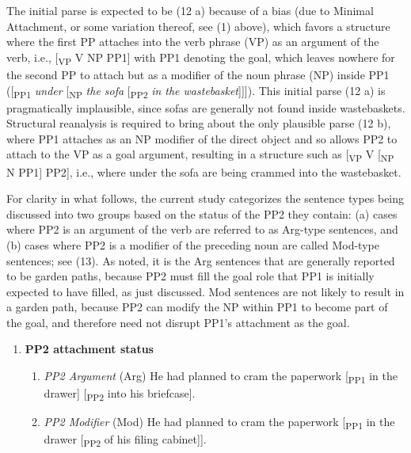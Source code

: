 \documentclass[12pt,oneside]{book}
\providecommand{\tightlist}{%
  \setlength{\itemsep}{0pt}\setlength{\parskip}{0pt}}
\begin{document}
The initial parse is expected to be (12 a) because of a bias (due to Minimal Attachment, or some variation thereof, see (1) above), which favors a structure where the first PP attaches into the verb phrase (VP) as an argument of the verb, i.e., {[}\textsubscript{VP} V NP PP1{]} with PP1 denoting the goal, which leaves nowhere for the second PP to attach but as a modifier of the noun phrase (NP) inside PP1 ({[}\textsubscript{PP1} \emph{under} {[}\textsubscript{NP} \emph{the sofa} {[}\textsubscript{PP2} \emph{in the wastebasket}{]}{]}{]}). This initial parse (12 a) is pragmatically implausible, since sofas are generally not found inside wastebaskets. Structural reanalysis is required to bring about the only plausible parse (12 b), where PP1 attaches as an NP modifier of the direct object and so allows PP2 to attach to the VP as a goal argument, resulting in a structure such as {[}\textsubscript{VP} V {[}\textsubscript{NP} N PP1{]} PP2{]}, i.e., where under the sofa are being crammed into the wastebasket.

For clarity in what follows, the current study categorizes the sentence types being discussed into two groups based on the status of the PP2 they contain: (a) cases where PP2 is an argument of the verb are referred to as Arg-type sentences, and (b) cases where PP2 is a modifier of the preceding noun are called Mod-type sentences; see (13). As noted, it is the Arg sentences that are generally reported to be garden paths, because PP2 must fill the goal role that PP1 is initially expected to have filled, as just discussed. Mod sentences are not likely to result in a garden path, because PP2 can modify the NP within PP1 to become part of the goal, and therefore need not disrupt PP1's attachment as the goal.

\begin{enumerate}
\def\labelenumi{(\arabic{enumi})}
\setcounter{enumi}{12}
\tightlist
\item
  \textbf{PP2 attachment status}

  \begin{enumerate}
  \def\labelenumii{(\alph{enumii})}
  \tightlist
  \item
    \emph{PP2 Argument} (Arg) \linebreak
    He had planned to cram the paperwork {[}\textsubscript{PP1} in the drawer{]} {[}\textsubscript{PP2} into his briefcase{]}.
  \item
    \emph{PP2 Modifier} (Mod) \linebreak
    He had planned to cram the paperwork {[}\textsubscript{PP1} in the drawer {[}\textsubscript{PP2} of his filing cabinet{]}{]}.
  \end{enumerate}
\end{enumerate}
\end{document}
